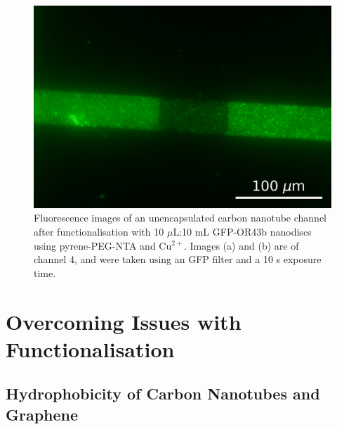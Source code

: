 \documentclass[
  a4paper,
]{scrbook}
\begin{document}
\begin{figure}
\begin{minipage}[t]{0.47\linewidth}
{{\includegraphics{figures/ch6/modified_GFPOR_Cu2+_10sexposure_40X_mediumcontrast_ch4_231027.png}

}

}

\subcaption{\label{fig-PPN-GFP-OR-2}}
\end{minipage}%

\caption{\label{fig-PPN-GFP-ORs}Fluorescence images of an unencapsulated
carbon nanotube channel after functionalisation with 10 \(\mu\)L:10 mL
GFP-OR43b nanodiscs using pyrene-PEG-NTA and Cu\(^{2+}\). Images (a) and
(b) are of channel 4, and were taken using an GFP filter and a 10 s
exposure time.}

\end{figure}

\hypertarget{sec-impediments}{%
\section{Overcoming Issues with
Functionalisation}\label{sec-impediments}}

\hypertarget{sec-hydrophobicity}{%
\subsection{Hydrophobicity of Carbon Nanotubes and
Graphene}\label{sec-hydrophobicity}}
\end{document}
